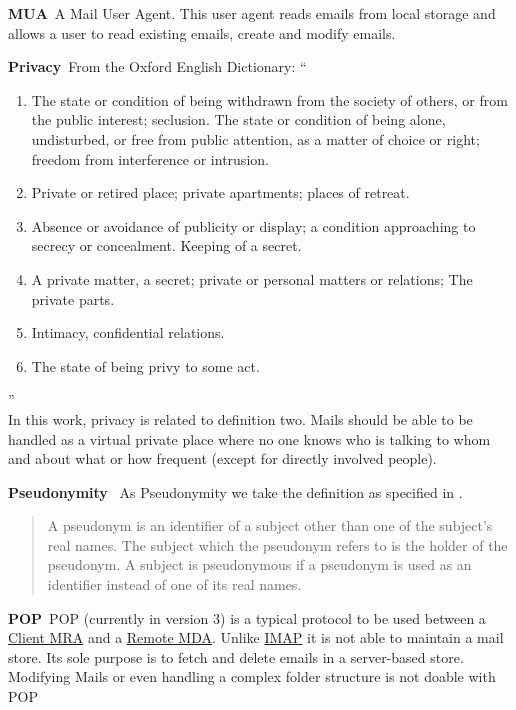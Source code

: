 \documentclass[a4paper,appendixprefix,pdfusetitle,twocolumn,fontsize=8pt,draft,DIV=calc]{scrbook}
\newenvironment{entry}{\par\leavevmode\hangpara{1.5mm}{1}\ignorespaces}{\RaggedRight\par}
\newcommand*{\mainentry}[2]{{\bfseries{#1\label{def:#1}}}~#2\par}
\newcommand*{\defref}[1]{\hyperref[def:#1]{#1}}
\begin{document}
\begin{entry}
	\mainentry{MUA}{A Mail User Agent. This user agent reads emails from local storage and allows a user to read existing emails, create and modify emails.}
\end{entry}

\begin{entry}
	\mainentry{Privacy}{From the Oxford English Dictionary: ``
		\begin{enumerate}
			\item The state or condition of being withdrawn from the society of others, or from the public interest; seclusion. The state or condition of being alone, undisturbed, or free from public attention, as a matter of choice or right; freedom from interference or intrusion.
			\item Private or retired place; private apartments; places of retreat.
			\item Absence or avoidance of publicity or display; a condition approaching to secrecy or concealment. Keeping of a secret.
			\item A private matter, a secret; private or personal matters or relations; The private parts.
			\item Intimacy, confidential relations.
			\item The state of being privy to some act.
		\end{enumerate}''\cite{OXFORD}\\
		In this work, privacy is related to definition two. Mails should be able to be handled as a virtual private place where no one knows who is talking to whom and about what or how frequent (except for directly involved people).
	}
\end{entry}

\begin{entry}
	\mainentry{Pseudonymity}{
		As Pseudonymity we take the definition as specified in \cite{anonTerminology}.
		\begin{quote}
			A pseudonym is an identifier of a subject other than one of the subject's real names. The subject which the pseudonym refers to is the holder of the pseudonym. A subject is pseudonymous if a pseudonym is used as an identifier instead of one of its real names.\omitted
		\end{quote}
	}
\end{entry}

\begin{entry}
	\mainentry{POP}{POP (currently in version 3) is a typical protocol to be used between a \defref{Client MRA} and a \defref{Remote MDA}. Unlike \defref{IMAP} it is not able to maintain a mail store. Its sole purpose is to fetch and delete emails in a server-based store. Modifying Mails or even handling a complex folder structure is not doable with POP}
\end{entry}
\end{document}
